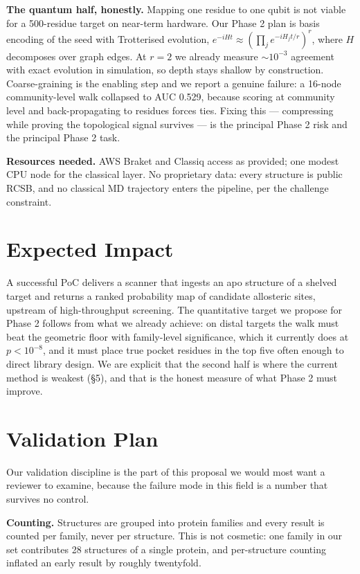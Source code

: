 \documentclass[10pt,a4paper]{article}
\begin{document}
\textbf{The quantum half, honestly.} Mapping one residue to one qubit is not viable for a
500-residue target on near-term hardware. Our Phase 2 plan is basis encoding of the seed with
Trotterised evolution, $e^{-iHt}\approx(\prod_j e^{-iH_jt/r})^r$, where $H$ decomposes over graph
edges. At $r=2$ we already measure $\sim10^{-3}$ agreement with exact evolution in simulation, so
depth stays shallow by construction. Coarse-graining is the enabling step and we report a genuine
failure: a 16-node community-level walk collapsed to AUC 0.529, because scoring at community level
and back-propagating to residues forces ties. Fixing this --- compressing while proving the
topological signal survives --- is the principal Phase 2 risk and the principal Phase 2 task.

\textbf{Resources needed.} AWS Braket and Classiq access as provided; one modest CPU node for the
classical layer. No proprietary data: every structure is public RCSB, and no classical MD
trajectory enters the pipeline, per the challenge constraint.

\section{Expected Impact}

A successful PoC delivers a scanner that ingests an apo structure of a shelved target and returns a
ranked probability map of candidate allosteric sites, upstream of high-throughput screening. The
quantitative target we propose for Phase 2 follows from what we already achieve: on distal targets
the walk must beat the geometric floor with family-level significance, which it currently does at
$p<10^{-8}$, and it must place true pocket residues in the top five often enough to direct library
design. We are explicit that the second half is where the current method is weakest (\S5), and that
is the honest measure of what Phase 2 must improve.

\section{Validation Plan}

Our validation discipline is the part of this proposal we would most want a reviewer to examine,
because the failure mode in this field is a number that survives no control.

\textbf{Counting.} Structures are grouped into protein families and every result is counted per
family, never per structure. This is not cosmetic: one family in our set contributes 28 structures
of a single protein, and per-structure counting inflated an early result by roughly twentyfold.
\end{document}
